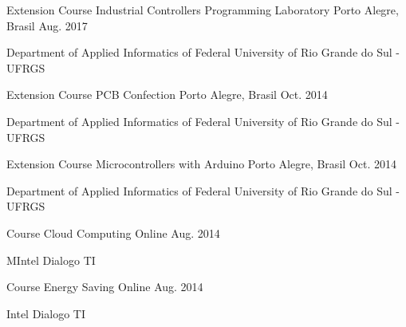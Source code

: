 \begin{cventries}
  \cventry
    {Extension Course} %
    {Industrial Controllers Programming Laboratory} %
    {Porto Alegre, Brasil} %
    {Aug. 2017} %
    {
      \begin{cvitems} %
        \item {Department of Applied Informatics of Federal University of Rio Grande do Sul - UFRGS}
      \end{cvitems}
    }

  \cventry
    {Extension Course} %
    {PCB Confection} %
    {Porto Alegre, Brasil} %
    {Oct. 2014} %
    {
      \begin{cvitems} %
        \item {Department of Applied Informatics of Federal University of Rio Grande do Sul - UFRGS}
      \end{cvitems}    
    }

  \cventry
    {Extension Course} %
    {Microcontrollers with Arduino} %
    {Porto Alegre, Brasil} %
    {Oct. 2014} %
    {
      \begin{cvitems} %
        \item {Department of Applied Informatics of Federal University of Rio Grande do Sul - UFRGS}
      \end{cvitems}    
    }
  \cventry
    {Course} %
    {Cloud Computing} %
    {Online} %
    {Aug. 2014} %
    {
      \begin{cvitems} %
        \item {MIntel Dialogo TI}
      \end{cvitems}
    }

  \cventry
    {Course} %
    {Energy Saving} %
    {Online} %
    {Aug. 2014} %
    {
     \begin{cvitems} %
        \item {Intel Dialogo TI}
      \end{cvitems}
    }

\end{cventries}
